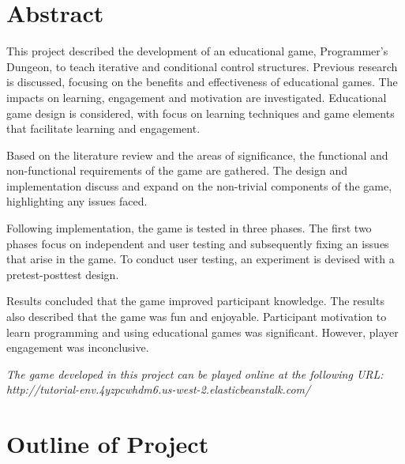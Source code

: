 \documentclass[a4paper,11.5pt]{report}
\numberwithin{figure}{section}
\numberwithin{table}{section}
\numberwithin{equation}{section}
\numberwithin{equation}{section}
\newcommand\blankpage{%
    \null
    \thispagestyle{empty}%
    \addtocounter{page}{-1}%
    \newpage}
\begin{document}
\afterpage{\blankpage}

\hfill

\section*{\Huge{Abstract}}

This project described the development of an educational game, Programmer's Dungeon, to teach iterative and conditional control structures. Previous research is discussed, focusing on the benefits and effectiveness of educational games. The impacts on learning, engagement and motivation are investigated. Educational game design is considered, with focus on learning techniques and game elements that facilitate learning and engagement.

Based on the literature review and the areas of significance, the functional and non-functional requirements of the game are gathered. The design and implementation discuss and expand on the non-trivial components of the game, highlighting any issues faced. 

Following implementation, the game is tested in three phases. The first two phases focus on independent and user testing and subsequently fixing an issues that arise in the game. To conduct user testing, an experiment is devised with a pretest-posttest design. 

Results concluded that the game improved participant knowledge. The results also described that the game was fun and enjoyable. Participant motivation to learn programming and using educational games was significant. However, player engagement was inconclusive. 

\textit{The game developed in this project can be played online at the following URL: http://tutorial-env.4yzpcwhdm6.us-west-2.elasticbeanstalk.com/}




\newpage

\tableofcontents

\newpage
{%
\let\oldnumberline\numberline%
\renewcommand{\numberline}{\figurename~\oldnumberline}%
\listoffigures%
}

\newpage
\listoftables  

\newpage
\hfill

\section*{\Huge{Outline of Project}}
\end{document}
